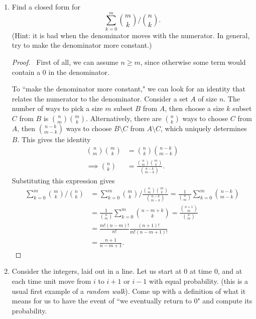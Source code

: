 \documentclass[12pt]{article}
\begin{document}
\begin{enumerate}[leftmargin=0cm,itemindent=.5cm,labelwidth=\itemindent,labelsep=0cm,align=left]
\item Find a closed form for
$$
\sum\limits_{k=0}^m \binom{m}{k} / \binom{n}{k}.
$$
(Hint: it is bad when the denominator moves with the numerator.  In general, try to make the denominator more constant.)

\begin{proof}
\ First of all, we can assume $n \geq m$, since otherwise some term would contain a $0$ in the denominator.

To ``make the denominator more constant," we can look for an identity that relates the numerator to the denominator.  Consider a set $A$ of size $n$.  The number of ways to pick a size $m$ subset $B$ from $A$, then choose a size $k$ subset $C$ from $B$ is $\binom{n}{m}\binom{m}{k}$.  Alternatively, there are $\binom{n}{k}$ ways to choose $C$ from $A$, then $\binom{n-k}{m-k}$ ways to choose $B \setminus C$ from $A \setminus C$, which uniquely determines $B$.  This gives the identity
\begin{align*}
\binom{n}{m} \binom{m}{k} &= \binom{n}{k} \binom{n-k}{m-k}
\\
\implies
\binom{n}{k} &= \frac{\binom{n}{m} \binom{m}{k}}{\binom{n-k}{m-k}}.
\end{align*}
Substituting this expression gives
\begin{align*}
\sum\limits_{k=0}^m \binom{m}{k} / \binom{n}{k}
&=
\sum\limits_{k=0}^m \binom{m}{k} / \frac{\binom{n}{m} \binom{m}{k}}{\binom{n-k}{m-k}}
= \frac{1}{\binom{n}{m}} \sum\limits_{k=0}^m \binom{n-k}{m-k}
\\
&= \frac{1}{\binom{n}{m}} \sum\limits_{k=0}^m \binom{n-m+k}{k} = \frac{\binom{n+1}{m}}{\binom{n}{m}}  \\
&= \frac{m! (n-m)!}{n!} \frac{(n+1)!}{m!(n-m +1)!} \\
&= \frac{n+1}{n-m+1}.
\end{align*}

\end{proof}

\item Consider the integers, laid out in a line.  Let us start at 0 at time 0, and at each time unit move from $i$ to $i+1$ or $i-1$ with equal probability.  (this is a usual first example of a \emph{random walk}).  Come up with a definition of what it means for us to have the event of ``we eventually return to 0" and compute its probability.


\end{enumerate}
\end{document}
